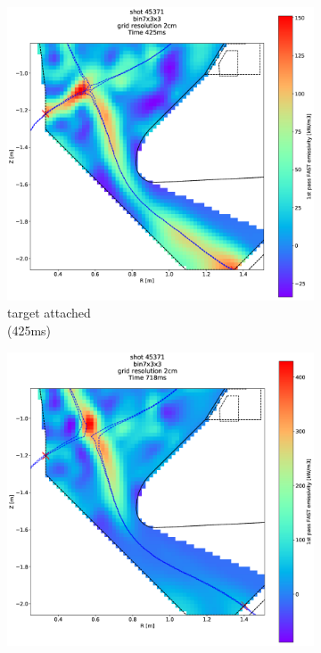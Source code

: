 \begin{figure}
     \centering
     \begin{subfigure}{0.21\textwidth}
         \centering
         \includegraphics[trim={0 0 25 0},clip,width=\textwidth]{Chapters/chapter2/figs/45371_1.png}
         \caption{target attached\\(425ms)}
         \label{fig:45371_1}
     \end{subfigure}
     \hfill
     \begin{subfigure}{0.21\textwidth}
         \centering
         \includegraphics[trim={70 0 0 0},clip,width=\textwidth]{Chapters/chapter2/figs/45371_2.png}

\end{subfigure}
\end{figure}
